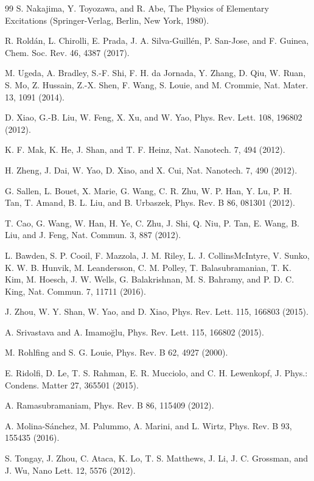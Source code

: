 \documentclass[11pt,a4paper]{ctexart}
\begin{document}
\begin{thebibliography}{99}
 S. Nakajima, Y. Toyozawa, and R. Abe, The Physics of Elementary Excitations (Springer-Verlag, Berlin, New York, 1980).

 R. Roldán, L. Chirolli, E. Prada, J. A. Silva-Guillén, P. San-Jose, and F. Guinea, Chem. Soc. Rev. 46, 4387 (2017).

 M. Ugeda, A. Bradley, S.-F. Shi, F. H. da Jornada, Y. Zhang, D. Qiu, W. Ruan, S. Mo, Z. Hussain, Z.-X. Shen, F. Wang, S. Louie, and M. Crommie, Nat. Mater. 13, 1091 (2014).

 D. Xiao, G.-B. Liu, W. Feng, X. Xu, and W. Yao, Phys. Rev. Lett. 108, 196802 (2012).

 K. F. Mak, K. He, J. Shan, and T. F. Heinz, Nat. Nanotech. 7, 494 (2012).

 H. Zheng, J. Dai, W. Yao, D. Xiao, and X. Cui, Nat. Nanotech. 7, 490 (2012).

 G. Sallen, L. Bouet, X. Marie, G. Wang, C. R. Zhu, W. P. Han, Y. Lu, P. H. Tan, T. Amand, B. L. Liu, and B. Urbaszek, Phys. Rev. B 86, 081301 (2012).

 T. Cao, G. Wang, W. Han, H. Ye, C. Zhu, J. Shi, Q. Niu, P. Tan, E. Wang, B. Liu, and J. Feng, Nat. Commun. 3, 887 (2012).

 L. Bawden, S. P. Cooil, F. Mazzola, J. M. Riley, L. J. CollinsMcIntyre, V. Sunko, K. W. B. Hunvik, M. Leandersson, C. M. Polley, T. Balasubramanian, T. K. Kim, M. Hoesch, J. W. Wells, G. Balakrishnan, M. S. Bahramy, and P. D. C. King, Nat. Commun. 7, 11711 (2016).

 J. Zhou, W. Y. Shan, W. Yao, and D. Xiao, Phys. Rev. Lett. 115, 166803 (2015).

 A. Srivastava and A. Imamoğlu, Phys. Rev. Lett. 115, 166802 (2015).

 M. Rohlfing and S. G. Louie, Phys. Rev. B 62, 4927 (2000).

 E. Ridolfi, D. Le, T. S. Rahman, E. R. Mucciolo, and C. H. Lewenkopf, J. Phys.: Condens. Matter 27, 365501 (2015).

 A. Ramasubramaniam, Phys. Rev. B 86, 115409 (2012).

 A. Molina-Sánchez, M. Palummo, A. Marini, and L. Wirtz, Phys. Rev. B 93, 155435 (2016).

 S. Tongay, J. Zhou, C. Ataca, K. Lo, T. S. Matthews, J. Li, J. C. Grossman, and J. Wu, Nano Lett. 12, 5576 (2012).


\end{thebibliography}
\end{document}
